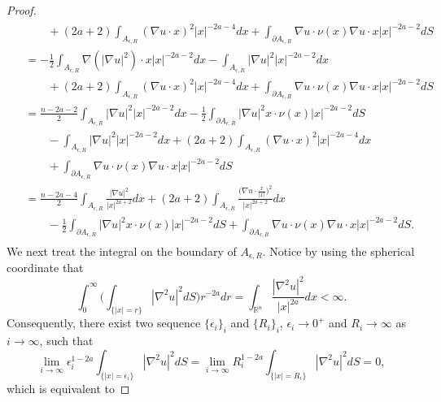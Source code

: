 \documentclass[a4paper,12pt]{article}
\theoremstyle{plain}
\theoremstyle{definition}
\theoremstyle{remark}
\def\R{\mathbb R}%
\def\ep{\epsilon}%
\def\pa{\partial}%
\def\irn{\int_{\R^n}}
\numberwithin{equation}{section}
\begin{document}
\begin{proof}
\begin{align}
\begin{split}
&\qquad + (2a +2) \int_{A_{\ep,R}} (\nabla u\cdot x)^2 |x|^{-2a -4} dx + \int_{\partial A_{\ep,R}} \nabla u \cdot \nu(x) \nabla u\cdot x |x|^{-2a -2} dS\\
&=-\frac12 \int_{A_{\ep,R}} \nabla(|\nabla u|^2) \cdot x |x|^{-2a -2} dx - \int_{A_{\ep,R}}|\nabla u|^2 |x|^{-2a -2} dx\\
&\qquad + (2a +2) \int_{A_{\ep,R}} (\nabla u\cdot x)^2 |x|^{-2a -4} dx+ \int_{\partial A_{\ep,R}} \nabla u \cdot \nu(x) \nabla u\cdot x |x|^{-2a -2} dS\\
&= \frac{n-2a -2}2 \int_{A_{\ep,R}} |\nabla u|^2 |x|^{-2a -2} dx -\frac12\int_{\partial A_{\ep,R}} |\nabla u|^2 x \cdot \nu(x) |x|^{-2a-2} dS\\
&\qquad - \int_{A_{\ep,R}} |\nabla u|^2 |x|^{-2a -2} dx + (2a +2) \int_{A_{\ep,R}} (\nabla u\cdot x)^2 |x|^{-2a -4} dx\\
&\qquad + \int_{\pa A_{\ep,R}} \nabla u \cdot \nu(x) \nabla u\cdot x |x|^{-2a -2} dS\\
& = \frac{n-2a -4}2 \int_{A_{\ep,R}} \frac{|\nabla u|^2}{ |x|^{2a +2}} dx + (2a +2) \int_{A_{\ep,R}} \frac{\Big(\nabla u\cdot \frac{x}{|x|}\Big)^2}{ |x|^{2a +2}} dx\\
&\qquad -\frac12\int_{\partial A_{\ep,R}} |\nabla u|^2 x \cdot \nu(x) |x|^{-2a-2} dS + \int_{\pa A_{\ep,R}} \nabla u \cdot \nu(x) \nabla u\cdot x |x|^{-2a -2} dS.
\end{split}
\end{align}
We next treat the integral on the boundary of $A_{\ep,R}$. Notice by using the spherical coordinate that
\[
\int_0^\infty \Big(\int_{\{|x| =r\}}|\nabla^2 u|^2 dS\Big) r^{-2a} dr =  \irn \frac{|\nabla^2 u|^2}{|x|^{2a}} dx < \infty.
\]
Consequently, there exist two sequence $\{\ep_i\}_i$ and $\{R_i\}_i$,  $\ep_i \to 0^+$ and $R_i\to \infty$ as $i\to \infty$, such that
\[
\lim_{i \to \infty} \ep_i^{1-2a} \int_{\{|x| =\ep_i\}}|\nabla^2 u|^2 dS = \lim_{i\to \infty} R_i^{1-2a}\int_{\{|x| =R_i\}}|\nabla^2 u|^2 dS = 0,
\]
which is equivalent to


\end{proof}
\end{document}
